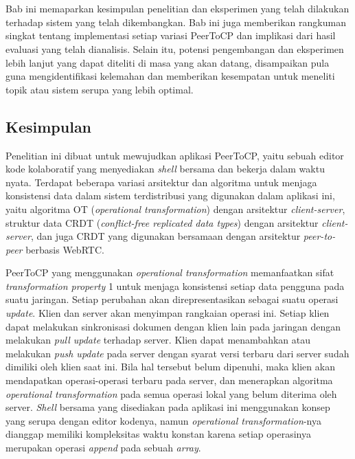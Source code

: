 \chapter{\kesimpulan}
\label{bab:6}
Bab ini memaparkan kesimpulan penelitian dan eksperimen yang telah dilakukan terhadap sistem yang telah dikembangkan. Bab ini juga memberikan rangkuman singkat tentang implementasi setiap variasi PeerToCP dan implikasi dari hasil evaluasi yang telah dianalisis. Selain itu, potensi pengembangan dan eksperimen lebih lanjut yang dapat diteliti di masa yang akan datang, disampaikan pula guna mengidentifikasi kelemahan dan memberikan kesempatan untuk meneliti topik atau sistem serupa yang lebih optimal.

\section{Kesimpulan}
\label{sec:kesimpulan}

Penelitian ini dibuat untuk mewujudkan aplikasi PeerToCP, yaitu sebuah editor kode kolaboratif yang menyediakan \textit{shell} bersama dan bekerja dalam waktu nyata. Terdapat beberapa variasi arsitektur dan algoritma untuk menjaga konsistensi data dalam sistem terdistribusi yang digunakan dalam aplikasi ini, yaitu algoritma OT (\textit{operational transformation}) dengan arsitektur \textit{client-server}, struktur data CRDT (\textit{conflict-free replicated data types}) dengan arsitektur \textit{client-server}, dan juga CRDT yang digunakan bersamaan dengan arsitektur \textit{peer-to-peer} berbasis WebRTC.

PeerToCP yang menggunakan \textit{operational transformation} memanfaatkan sifat \textit{transformation property} 1 untuk menjaga konsistensi setiap data pengguna pada suatu jaringan. Setiap perubahan akan direpresentasikan sebagai suatu operasi \textit{update}. Klien dan server akan menyimpan rangkaian operasi ini. Setiap klien dapat melakukan sinkronisasi dokumen dengan klien lain pada jaringan dengan melakukan \textit{pull update} terhadap server. Klien dapat menambahkan atau melakukan \textit{push update} pada server dengan syarat versi terbaru dari server sudah dimiliki oleh klien saat ini. Bila hal tersebut belum dipenuhi, maka klien akan mendapatkan operasi-operasi terbaru pada server, dan menerapkan algoritma \textit{operational transformation} pada semua operasi lokal yang belum diterima oleh server. \textit{Shell} bersama yang disediakan pada aplikasi ini menggunakan konsep yang serupa dengan editor kodenya, namun \textit{operational transformation}-nya dianggap memiliki kompleksitas waktu konstan karena setiap operasinya merupakan operasi \textit{append} pada sebuah \textit{array}.

